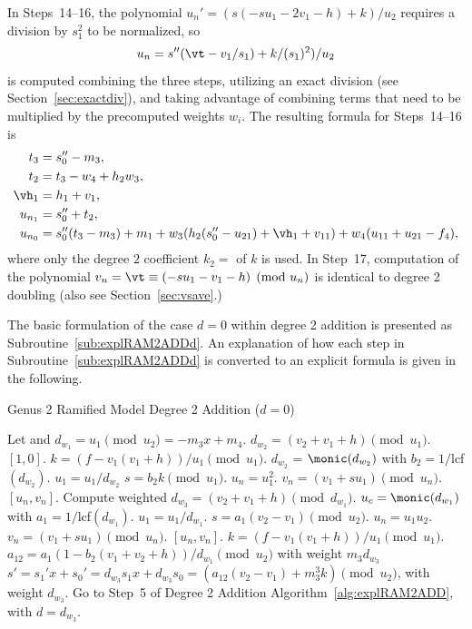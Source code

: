 In Steps~14--16, the polynomial $u_n' = (s(-su_1 - 2v_1 - h ) + k)/u_2$ requires a division by $s_1^2$ to
be normalized, so $$ u_n = s''(\vt - v_1/s_1) + k/(s_1)^2)/u_2$$ is computed combining the three steps,
utilizing an exact division (see Section~\ref{sec:exactdiv}), and taking advantage
of combining terms that need to be multiplied by the precomputed weights $w_i$.
The resulting formula for Steps~14--16 is 
\begin{align*}
    t_3 &= s''_0 - m_3,\\
    t_2 &= t_3- w_4 + h_2w_3,\\
    \vh_1 &= h_1 + v_1,\\
    u_{n_1} &= s_0'' + t_2,\\
    u_{n_0} &= s_0''(t_3 - m_3) + m_1 + w_3(h_2(s''_0 - u_{21}) + \vh_1 + v_{11}) + w_4(u_{11} + u_{21} - f_4),
\end{align*}
where only the degree $2$ coefficient $k_2 = $ of $k$ is used. In Step~17,
computation of the polynomial $v_n = \vt \equiv (-su_1 - v_1 - h) \pmod{u_n}$ is
identical to degree 2 doubling (also see Section~\ref{sec:vsave}.)

The basic formulation of the case $d = 0$ within degree 2 addition is presented
as Subroutine~\ref{sub:explRAM2ADDd}. An explanation of how each step in
Subroutine~\ref{sub:explRAM2ADDd} is converted to an explicit formula is given
in the following. 

\begin{subroutine}[htbp]
    \caption{Genus 2 Ramified Model Degree 2 Addition ($d=0$)\label{sub:explRAM2ADDd}}
    \begin{algorithmic}[1]
    \State Let and $d_{w_1} = u_1 \pmod{u_2} = -m_3x + m_4$.
        \State $d_{w_2} = (v_2 + v_1 + h) \pmod{u_1}$.
         \Return $[1,0]$.
        \Else 
            \State $k = (f - v_1(v_1 + h))/u_1 \pmod{u_1}$.
            \State $d_{w_2}$ = $\monic(d_{w_2})$ with $b_2 = 1/$lcf$(d_{w_2})$.
            \State $u_1 = u_1/d_{w_2}$
            \State $s = b_2k \pmod{u_1}$.
            \State $u_n = u_1^2$.
            \State $v_n = (v_1 + su_1) \pmod{u_n}$.
            \State \Return $[u_n,v_n]$.
        \EndIf
    \Else 
        \State Compute weighted $d_{w_3} = (v_2 + v_1 + h) \pmod{d_{w_1}}$.
            \State $u_c = \monic(d_{w_1})$ with $a_1 = 1/$lcf$(d_{w_1})$.
            \State $u_1 = u_1/d_{w_1}$.
            \State $s = a_1(v_2 - v_1) \pmod{u_2}$.
            \State $u_n = u_1u_2$.
            \State $v_n = (v_1 + su_1) \pmod{u_n}$.
            \State \Return $[u_n,v_n]$.
        \Else 
            \State $k = (f - v_1(v_1 + h))/u_1 \pmod{u_1}$.
            \State $a_{12} = a_1(1 - b_2(v_1 + v_2 + h))/d_{w_1} \pmod{u_2}$ with weight $m_3d_{w_3}$
            \State $s' = s_1'x + s_0' = d_{w_3}s_1x + d_{w_3}s_0 = (a_{12}(v_2 - v_1) + m_3^3k) \pmod{u_2}$, with weight $d_{w_3}$.
            \State Go to Step~5 of Degree 2 Addition Algorithm~\ref{alg:explRAM2ADD}, with $d = d_{w_3}$.
        \EndIf
    \EndIf
    \end{algorithmic}
    \end{subroutine}


